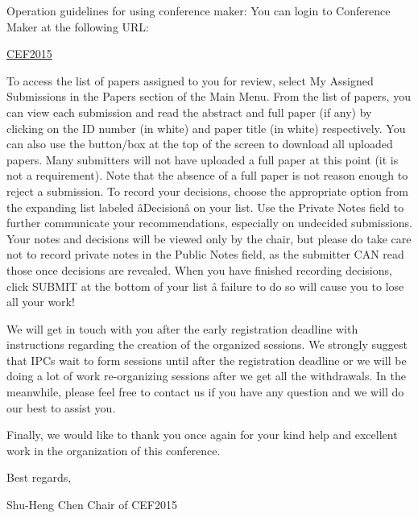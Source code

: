 \documentclass[12pt]{article}
\begin{document}
Operation guidelines for using conference maker: You can login to Conference Maker at the following URL:

\href{https://editorialexpress.com/cgi-bin/conference/conference.cgi?action=login&subaction=login&db_name=CEF2015}{CEF2015}

To access the list of papers assigned to you for review, select My Assigned Submissions in the Papers section of the Main Menu. 
From the list of papers, you can view each submission and read the abstract and full paper (if any) by clicking on the ID number (in white) and paper title (in white) respectively. You can also use the button/box at the top of the screen to download all uploaded papers. 
Many submitters will not have uploaded a full paper at this point (it is not a requirement). Note that the absence of a full paper is not reason enough to reject a submission. 
To record your decisions, choose the appropriate option from the expanding list labeled âDecisionâ on your list. Use the Private Notes field to further communicate your recommendations, especially on undecided submissions. 
Your notes and decisions will be viewed only by the chair, but please do take care not to record private notes in the Public Notes field, as the submitter CAN read those once decisions are revealed. 
When you have finished recording decisions, click SUBMIT at the bottom of your list â failure to do so will cause you to lose all your work!

We will get in touch with you after the early registration deadline with instructions regarding the creation of the organized sessions.  We strongly suggest that IPCs wait to form sessions until after the registration deadline or we will be doing a lot of work re-organizing sessions after we get all the withdrawals. In the meanwhile, please feel free to contact us if you have any question and we will do our best to assist you. 

Finally, we would like to thank you once again for your kind help and excellent work in the organization of this conference. 

Best regards,

Shu-Heng Chen
Chair of CEF2015
\end{document}
